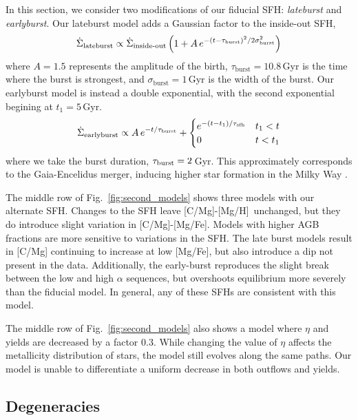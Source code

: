\documentclass[fleqn,usenatbib]{mnras}
\newcommand{\agb}{AGB}
\newcommand{\sfh}{SFH} %
\newcommand{\caah}{[C/Mg]-[Mg/H]}
\newcommand{\caafe}{[C/Mg]-[Mg/Fe]}
\begin{document}
In this section, we consider two modifications of our fiducial \sfh{}: \textit{lateburst} and \textit{earlyburst}.
Our lateburst model adds a Gaussian factor to the inside-out \sfh{},
\begin{equation}\label{eq:lateburst}
    \dot{\Sigma}_\text{lateburst} \propto \dot{\Sigma}_\text{inside-out} \left(1 + A\,e^{-(t-\tau_{\rm burst})^2/2\sigma^2_{\rm burst}} \right)
\end{equation}
where $A=1.5$ represents the amplitude of the birth, $\tau_\text{burst}=10.8$\,Gyr is the time where the burst is strongest, and $\sigma_\text{burst}=1$\,Gyr is the width of the burst.
Our earlyburst model is instead a double exponential, with the second exponential begining at $t_1=5\,$Gyr.
\begin{equation}\label{eq:twoinfall}
    \dot{\Sigma}_{\rm earlyburst} \propto A\,e^{-t/\tau_{\rm burst}} + 
\begin{cases}
    e^{-(t-t_1)/\tau_\text{sfh}} & t_1 < t \\
      0 & t<t_1
\end{cases}
\end{equation}
where we take the burst duration, $\tau_{\rm burst}=2$\,Gyr.
This approximately corresponds to the Gaia-Encelidus merger, inducing higher star formation in the Milky Way \citep{spitoni21, bonaca20, helmi18}.

The middle row of Fig.~\ref{fig:second_models} shows three models with our alternate \sfh{}. Changes to the \sfh{} leave \caah\ unchanged, but they do introduce slight variation in \caafe. Models with higher \agb{} fractions are more sensitive to variations in the \sfh{}. The late burst models result in [C/Mg] continuing to increase at low [Mg/Fe], but also introduce a dip not present in the data. Additionally, the early-burst
reproduces the slight break between the low and high $\alpha$ sequences, but overshoots equilibrium more severely than the fiducial model. 
In general, any of these \sfh{}s are consistent with this model.

The middle row of Fig.~\ref{fig:second_models} also shows a model where $\eta$ and yields are decreased by a factor 0.3. While changing the value of $\eta$ affects the metallicity distribution of stars, the model still evolves along the same paths. Our model is unable to differentiate a uniform decrease in both outflows and yields.


\subsection{Degeneracies} \label{sec:outflows}
\end{document}
